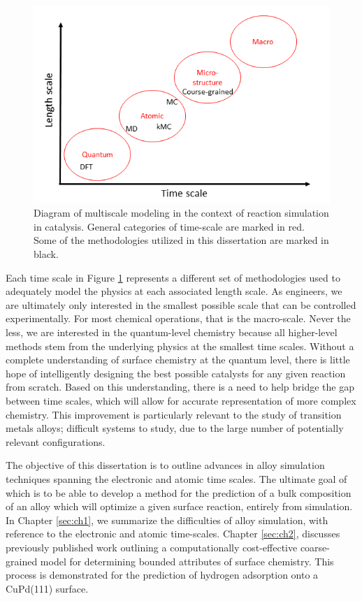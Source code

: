 \documentclass[12pt,oneside]{cmuthesis}
\begin{document}
\begin{figure}[h]
\centering
\includegraphics[width=5.5in]{./images/fig-multiscale.png}
\caption{Diagram of multiscale modeling in the context of reaction simulation in catalysis. General categories of time-scale are marked in red. Some of the methodologies utilized in this dissertation are marked in black. \label{fig-multiscale}}
\end{figure}

Each time scale in Figure \ref{fig-multiscale} represents a different set of methodologies used to adequately model the physics at each associated length scale. As engineers, we are ultimately only interested in the smallest possible scale that can be controlled experimentally. For most chemical operations, that is the macro-scale. Never the less, we are interested in the quantum-level chemistry because all higher-level methods stem from the underlying physics at the smallest time scales. Without a complete understanding of surface chemistry at the quantum level, there is little hope of intelligently designing the best possible catalysts for any given reaction from scratch. Based on this understanding, there is a need to help bridge the gap between time scales, which will allow for accurate representation of more complex chemistry. This improvement is particularly relevant to the study of transition metals alloys; difficult systems to study, due to the large number of potentially relevant configurations.

The objective of this dissertation is to outline advances in alloy simulation techniques spanning the electronic and atomic time scales. The ultimate goal of which is to be able to develop a method for the prediction of a bulk composition of an alloy which will optimize a given surface reaction, entirely from simulation. In Chapter \ref{sec:ch1}, we summarize the difficulties of alloy simulation, with reference to the electronic and atomic time-scales. Chapter \ref{sec:ch2}, discusses previously published work \cite{boes-2015-estim-bulk} outlining a computationally cost-effective coarse-grained model for determining bounded attributes of surface chemistry. This process is demonstrated for the prediction of hydrogen adsorption onto a CuPd(111) surface.
\end{document}
